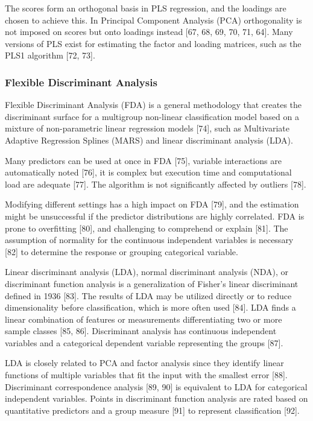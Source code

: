 \documentclass[sn-mathphys-num]{sn-jnl}%
\begin{document}
The scores form an orthogonal basis in PLS regression, and the loadings are chosen to achieve this. In Principal Component Analysis (PCA) orthogonality is not imposed on scores but onto loadings instead [67, 68, 69, 70, 71, 64]. Many versions of PLS exist for estimating the factor and loading matrices, such as the PLS1 algorithm [72, 73]. 

\subsubsection{Flexible Discriminant Analysis}

Flexible Discriminant Analysis (FDA) is a general methodology that creates the discriminant surface for a multigroup non-linear classification model based on a mixture of non-parametric linear regression models [74], such as Multivariate Adaptive Regression Splines (MARS) and linear discriminant analysis (LDA).

Many predictors can be used at once in FDA [75], variable interactions are automatically noted [76], it is complex but execution time and computational load are adequate [77]. The algorithm is not significantly affected by outliers [78].

Modifying different settings has a high impact on FDA [79], and the estimation might be unsuccessful if the predictor distributions are highly correlated. FDA is prone to overfitting [80], and challenging to comprehend or explain [81]. The assumption of normality for the continuous independent variables is necessary [82] to determine the response or grouping categorical variable. 

Linear discriminant analysis (LDA), normal discriminant analysis (NDA), or discriminant function analysis is a generalization of Fisher's linear discriminant defined in 1936 [83]. The results of LDA may be utilized directly or to reduce dimensionality before classification, which is more often used [84]. LDA finds a linear combination of features or measurements differentiating two or more sample classes [85, 86]. Discriminant analysis has continuous independent variables and a categorical dependent variable representing the groups [87].

LDA is closely related to PCA and factor analysis since they identify linear functions of multiple variables that fit the input with the smallest error [88]. Discriminant correspondence analysis [89, 90] is equivalent to LDA for categorical independent variables. Points in discriminant function analysis are rated based on quantitative predictors and a group measure [91] to represent classification [92].
\end{document}
